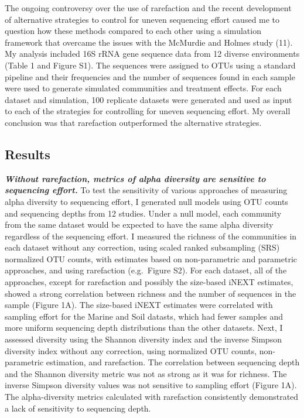 \documentclass[
]{article}
\begin{document}
The ongoing controversy over the use of rarefaction and the recent
development of alternative strategies to control for uneven sequencing
effort caused me to question how these methods compared to each other
using a simulation framework that overcame the issues with the McMurdie
and Holmes study (11). My analysis included 16S rRNA gene sequence data
from 12 diverse environments (Table 1 and Figure S1). The sequences were
assigned to OTUs using a standard pipeline and their frequencies and the
number of sequences found in each sample were used to generate simulated
communities and treatment effects. For each dataset and simulation, 100
replicate datasets were generated and used as input to each of the
strategies for controlling for uneven sequencing effort. My overall
conclusion was that rarefaction outperformed the alternative strategies.

\hypertarget{results}{%
\subsection{Results}\label{results}}

\textbf{\emph{Without rarefaction, metrics of alpha diversity are
sensitive to sequencing effort.}} To test the sensitivity of various
approaches of measuring alpha diversity to sequencing effort, I
generated null models using OTU counts and sequencing depths from 12
studies. Under a null model, each community from the same dataset would
be expected to have the same alpha diversity regardless of the
sequencing effort. I measured the richness of the communities in each
dataset without any correction, using scaled ranked subsampling (SRS)
normalized OTU counts, with estimates based on non-parametric and
parametric approaches, and using rarefaction (e.g.~Figure S2). For each
dataset, all of the approaches, except for rarefaction and possibly the
size-based iNEXT estimates, showed a strong correlation between richness
and the number of sequences in the sample (Figure 1A). The size-based
iNEXT estimates were correlated with sampling effort for the Marine and
Soil datasts, which had fewer samples and more uniform sequencing depth
distributions than the other datasets. Next, I assessed diversity using
the Shannon diversity index and the inverse Simpson diversity index
without any correction, using normalized OTU counts, non-parametric
estimation, and rarefaction. The correlation between sequencing depth
and the Shannon diversity metric was not as strong as it was for
richness. The inverse Simpson diversity values was not sensitive to
sampling effort (Figure 1A). The alpha-diversity metrics calculated with
rarefaction consistently demonstrated a lack of sensitivity to
sequencing depth.
\end{document}
